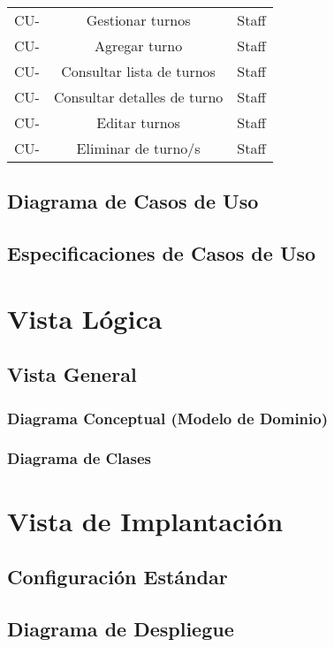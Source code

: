 \documentclass{article}
\begin{document}
\begin{center}
\begin{tabular}{ |c|c|c| }
            CU- & Gestionar turnos & Staff \\
            CU- & Agregar turno & Staff \\
            CU- & Consultar lista de turnos & Staff \\
            CU- & Consultar detalles de turno & Staff \\
            CU- & Editar turnos & Staff \\
            CU- & Eliminar de turno/s & Staff \\
            \hline
        \end{tabular}
    \end{center}

    \subsection{Diagrama de Casos de Uso}
    \subsection{Especificaciones de Casos de Uso}

    \section{Vista Lógica} \label{vistaLogica}
    \subsection{Vista General}
    \subsubsection{Diagrama Conceptual (Modelo de Dominio)}
    \subsubsection{Diagrama de Clases}

    \section{Vista de Implantación} \label{vistaImplantacion}
    \subsection{Configuración Estándar}
    \subsection{Diagrama de Despliegue}
\end{document}
